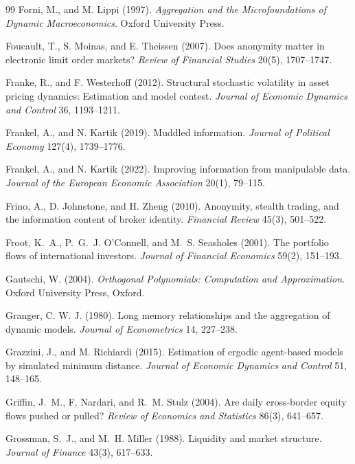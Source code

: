 \documentclass[12pt]{article}
\theoremstyle{definition}
\theoremstyle{remark}
\begin{document}
\begin{thebibliography}{99}
 Forni, M., and M. Lippi (1997). \emph{Aggregation and the Microfoundations of Dynamic Macroeconomics}. Oxford University Press.

 Foucault, T., S. Moinas, and E. Theissen (2007). Does anonymity matter in electronic limit order markets? \emph{Review of Financial Studies} 20(5), 1707--1747.

 Franke, R., and F. Westerhoff (2012). Structural stochastic volatility in asset pricing dynamics: Estimation and model contest. \emph{Journal of Economic Dynamics and Control} 36, 1193--1211.

 Frankel, A., and N. Kartik (2019). Muddled information. \emph{Journal of Political Economy} 127(4), 1739--1776.

 Frankel, A., and N. Kartik (2022). Improving information from manipulable data. \emph{Journal of the European Economic Association} 20(1), 79--115.

 Frino, A., D. Johnstone, and H. Zheng (2010). Anonymity, stealth trading, and the information content of broker identity. \emph{Financial Review} 45(3), 501--522.

 Froot, K.~A., P.~G.~J. O'Connell, and M.~S. Seasholes (2001). The portfolio flows of international investors. \emph{Journal of Financial Economics} 59(2), 151--193.

 Gautschi, W. (2004). \emph{Orthogonal Polynomials: Computation and Approximation}. Oxford University Press, Oxford.

 Granger, C. W. J. (1980). Long memory relationships and the aggregation of dynamic models. \emph{Journal of Econometrics} 14, 227--238.

 Grazzini, J., and M. Richiardi (2015). Estimation of ergodic agent-based models by simulated minimum distance. \emph{Journal of Economic Dynamics and Control} 51, 148--165.

 Griffin, J.~M., F. Nardari, and R.~M. Stulz (2004). Are daily cross-border equity flows pushed or pulled? \emph{Review of Economics and Statistics} 86(3), 641--657.

 Grossman, S.~J., and M.~H. Miller (1988). Liquidity and market structure. \emph{Journal of Finance} 43(3), 617--633.


\end{thebibliography}
\end{document}
